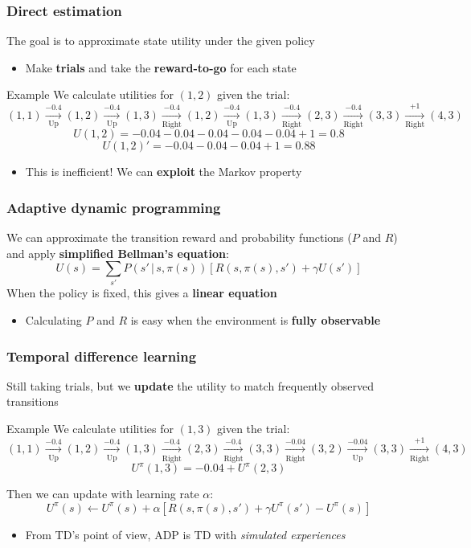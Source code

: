 \documentclass{beamer}
\begin{document}
\begin{frame}
	\frametitle{Direct estimation}
	The goal is to approximate state utility under the given policy
	\begin{itemize}
		\item Make \textbf{trials} and take the \textbf{reward-to-go} for each state
	\end{itemize}
	\pause
	\begin{block}{Example}
	We calculate utilities for $(1,2)$ given the trial:
		$$
		\scriptstyle
		(1,1) \xrightarrow[\mathrm{Up}]{-0.4} 
		(1,2) \xrightarrow[\mathrm{Up}]{-0.4}
		(1,3) \xrightarrow[\mathrm{Right}]{-0.4}
		(1,2) \xrightarrow[\mathrm{Up}]{-0.4}
		(1,3) \xrightarrow[\mathrm{Right}]{-0.4}
		(2,3) \xrightarrow[\mathrm{Right}]{-0.4}
		(3,3) \xrightarrow[\mathrm{Right}]{+1}
		(4,3)
	$$
	\pause
	$$
		U(1,2) = -0.04 -0.04 -0.04 -0.04 -0.04 + 1 = 0.8
	$$
	\pause
	$$
		U(1,2)' = -0.04 -0.04 -0.04 + 1 = 0.88
	$$
	\end{block}
	\pause
	\begin{itemize}
		\item This is inefficient! We can \textbf{exploit} the Markov property 
	\end{itemize}
\end{frame}

\begin{frame}
	\frametitle{Adaptive dynamic programming}
	We can approximate the transition reward and probability functions ($P$ and $R$) and apply \textbf{simplified Bellman's equation}:
	$$
		U(s) = \sum_{s'} P(s' \, | \, s, \pi(s)) \left[ R(s, \pi(s), s') + \gamma U(s') \right]
	$$
	When the policy is fixed, this gives a \textbf{linear equation}
	\pause
	\begin{itemize}
		\item Calculating $P$ and $R$ is easy when the environment is \textbf{fully observable} 
	\end{itemize}
\end{frame}

\begin{frame}
	\frametitle{Temporal difference learning}
	Still taking trials, but we \textbf{update} the utility to match frequently observed transitions
	\pause
	\begin{block}{Example}
	We calculate utilities for $(1,3)$ given the trial:
		$$
		\scriptstyle
		(1,1) \xrightarrow[\mathrm{Up}]{-0.4} 
	(1,2) \xrightarrow[\mathrm{Up}]{-0.4}
	(1,3) \xrightarrow[\mathrm{Right}]{-0.4}
	(2,3) \xrightarrow[\mathrm{Right}]{-0.4}
	(3,3) \xrightarrow[\mathrm{Right}]{-0.04}
	(3,2) \xrightarrow[\mathrm{Up}]{-0.04}
	(3,3) \xrightarrow[\mathrm{Right}]{+1}
	(4,3)	
	$$
	\pause
	$$
		U^\pi (1, 3) = -0.04 + U^\pi (2,3)
	$$
	\end{block}
	\pause
	Then we can update with learning rate $\alpha$:
	$$
	U^\pi(s) \leftarrow U^\pi(s) + \alpha \left[ R(s, \pi(s), s') + \gamma U^\pi (s') - U^\pi (s) \right]
	$$
	\begin{itemize}
		\item From TD's point of view, ADP is TD with \textit{simulated experiences}
	\end{itemize}
\end{frame}
\end{document}
